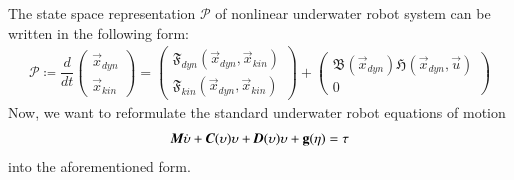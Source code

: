 The state space representation $\mathcal{P}$ of nonlinear underwater robot system can be written in the following form:
\begin{align}
\mathcal{P}
\coloneqq
\dfrac{d}{dt}
\begin{pmatrix}
\vec{x}_{dyn} \\
\vec{x}_{kin}
\end{pmatrix}=
\begin{pmatrix}
\mathfrak{F}_{dyn}(\vec{x}_{dyn},\vec{x}_{kin})\\
\mathfrak{F}_{kin}(\vec{x}_{dyn},\vec{x}_{kin})
\end{pmatrix}+
\begin{pmatrix}
\mathfrak{B}(\vec{x}_{dyn})\mathfrak{H}(\vec{x}_{dyn},\vec{u})\\0
\end{pmatrix}
\end{align}
Now, we want to reformulate the standard underwater robot equations of motion
\begin{align}
\emph{\textbf{M}}\dot{\vec{\upsilon}}+\emph{\textbf{C}}(\vec{\upsilon})\vec{\upsilon}+\emph{\textbf{D}}(\vec{\upsilon})\vec{\upsilon}+\vec{g}(\vec{\eta})=\vec{\tau}
\label{EQ:Dy}
\end{align}
into the aforementioned form.


